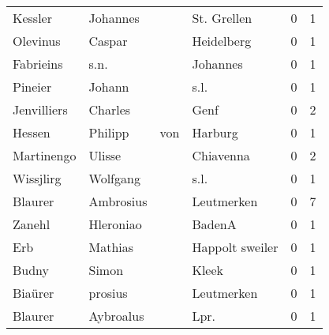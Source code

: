 \begin{center}
\begin{tiny}
\begin{longtabu}{llllrr}
                  Kessler &                           Johannes &             &                                 St. Grellen &          0 &         1 \\
                 Olevinus &                             Caspar &             &                                  Heidelberg &          0 &         1 \\
                Fabrieins &                               s.n. &             &                                    Johannes &          0 &         1 \\
                  Pineier &                             Johann &             &                                        s.l. &          0 &         1 \\
              Jenvilliers &                            Charles &             &                                        Genf &          0 &         2 \\
                   Hessen &                            Philipp &         von &                                     Harburg &          0 &         1 \\
               Martinengo &                             Ulisse &             &                                   Chiavenna &          0 &         2 \\
                Wissjlirg &                           Wolfgang &             &                                        s.l. &          0 &         1 \\
                  Blaurer &                          Ambrosius &             &                                  Leutmerken &          0 &         7 \\
                   Zanehl &                          Hleroniao &             &                                      BadenA &          0 &         1 \\
                      Erb &                            Mathias &             &                             Happolt sweiler &          0 &         1 \\
                    Budny &                              Simon &             &                                       Kleek &          0 &         1 \\
                  Biaürer &                            prosius &             &                                  Leutmerken &          0 &         1 \\
                  Blaurer &                          Aybroalus &             &                                       Lpr.  &          0 &         1 \\

\end{longtabu}
\end{tiny}
\end{center}
